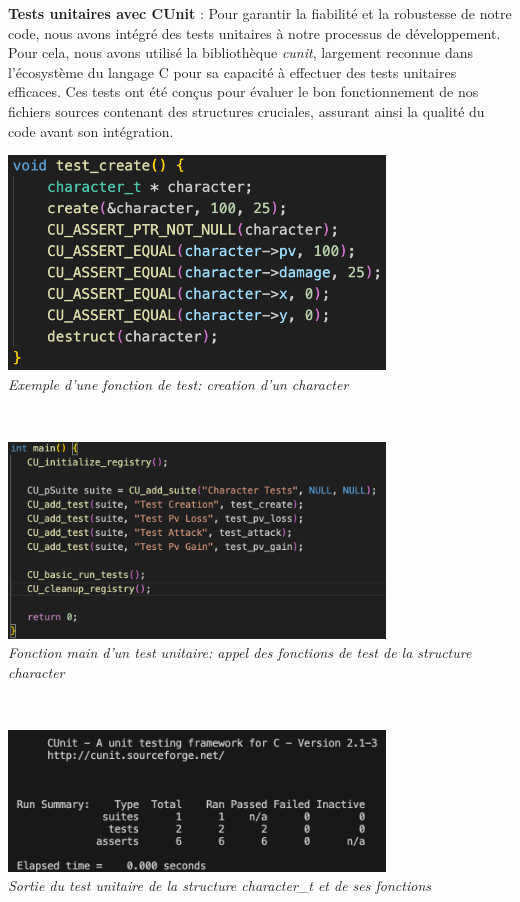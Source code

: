 \documentclass[10pt]{article}
\begin{document}
\textbf{Tests unitaires avec CUnit} :
Pour garantir la fiabilité et la robustesse de notre code, nous avons intégré des tests unitaires à notre processus de développement. Pour cela, nous avons utilisé la bibliothèque \textit{\gls{cunit}}, largement reconnue dans l'écosystème du langage C pour sa capacité à effectuer des tests unitaires efficaces. Ces tests ont été conçus pour évaluer le bon fonctionnement de nos fichiers sources contenant des structures cruciales, assurant ainsi la qualité du code avant son intégration. 
\begin{center}
\includegraphics[width=10cm]{create.png}\\
\caption{{\emph{Exemple d'une fonction de test: creation d'un character}}}
\label{fig4}\\
\end{center}
\begin{center}
\includegraphics[width=10cm]{maincunit.png}\\
\caption{{\emph{Fonction main d'un test unitaire: appel des fonctions de test de la structure character}}}
\label{fig5}\\
\end{center}
\begin{center}
\includegraphics[width=10cm]{cunit.png}\\
\caption{{\emph{Sortie du test unitaire de la structure character_t et de ses fonctions}}}
\label{fig6}\\
\end{center}
\end{document}
